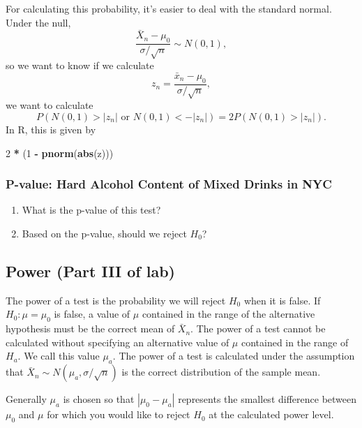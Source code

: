 \documentclass[]{article}
\newenvironment{Shaded}{\begin{snugshade}}{\end{snugshade}}
\newcommand{\DecValTok}[1]{\textcolor[rgb]{0.00,0.00,0.81}{#1}}
\newcommand{\KeywordTok}[1]{\textcolor[rgb]{0.13,0.29,0.53}{\textbf{#1}}}
\newcommand{\NormalTok}[1]{#1}
\newcommand{\OperatorTok}[1]{\textcolor[rgb]{0.81,0.36,0.00}{\textbf{#1}}}
\newcommand{\StringTok}[1]{\textcolor[rgb]{0.31,0.60,0.02}{#1}}
\begin{document}
For calculating this probability, it's easier to deal with the standard
normal. Under the null, \[
\frac{\bar X_n-\mu_0}{\sigma/\sqrt{n}}\sim N(0,1),
\] so we want to know if we calculate \[
z_n=\frac{\bar x_n-\mu_0}{\sigma/\sqrt{n}},
\] we want to calculate \[
P( N(0,1) > |z_n| \text{ or } N(0,1) < -|z_n|) = 2 P(N(0,1) > |z_n|).
\] In R, this is given by

\begin{Shaded}
\begin{Highlighting}[]
\DecValTok{2} \OperatorTok{*}\StringTok{ }\NormalTok{(}\DecValTok{1} \OperatorTok{-}\StringTok{ }\KeywordTok{pnorm}\NormalTok{(}\KeywordTok{abs}\NormalTok{(z)))}
\end{Highlighting}
\end{Shaded}

\hypertarget{p-value-hard-alcohol-content-of-mixed-drinks-in-nyc}{%
\subsubsection{P-value: Hard Alcohol Content of Mixed Drinks in
NYC}\label{p-value-hard-alcohol-content-of-mixed-drinks-in-nyc}}

\begin{enumerate}
\def\labelenumi{\alph{enumi})}
\item
  What is the p-value of this test?
\item
  Based on the p-value, should we reject \(H_0\)?
\end{enumerate}

\hypertarget{power-part-iii-of-lab}{%
\subsection{Power (Part III of lab)}\label{power-part-iii-of-lab}}

The power of a test is the probability we will reject \(H_0\) when it is
false. If \(H_0: \mu = \mu_0\) is false, a value of \(\mu\) contained in
the range of the alternative hypothesis must be the correct mean of
\(\bar X_n\). The power of a test cannot be calculated without
specifying an alternative value of \(\mu\) contained in the range of
\(H_a\). We call this value \(\mu_a\). The power of a test is calculated
under the assumption that \(\bar X_n \sim N(\mu_a,\sigma/\sqrt{n})\) is
the correct distribution of the sample mean.

Generally \(\mu_a\) is chosen so that \(|\mu_0 - \mu_{a}|\) represents
the smallest difference between \(\mu_0\) and \(\mu\) for which you
would like to reject \(H_0\) at the calculated power level.
\end{document}
